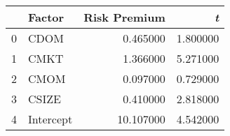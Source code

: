 \begin{tabular}{llrr}
\toprule
 & Factor & Risk Premium & \emph{t} \\
\midrule
0 & CDOM & 0.465000 & 1.800000 \\
1 & CMKT & 1.366000 & 5.271000 \\
2 & CMOM & 0.097000 & 0.729000 \\
3 & CSIZE & 0.410000 & 2.818000 \\
4 & Intercept & 10.107000 & 4.542000 \\
\bottomrule
\end{tabular}
